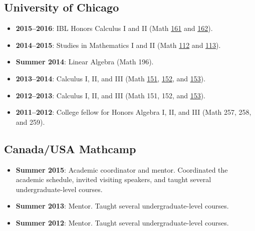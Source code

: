 \documentclass[a4paper]{moderncv}
\begin{document}
\subsection*{University of Chicago}
\label{sec:orgcc51889}
\begin{itemize}
\item \textbf{2015--2016}: IBL Honors Calculus I and II (Math \href{http://www.math.uchicago.edu/\~mcreek/fall\_2015/math\_16100/index.html}{161} and \href{teaching/162win16/}{162}).
\item \textbf{2014--2015}: Studies in Mathematics I and II (Math \href{112aut14/}{112} and \href{113win15/}{113}).
\item \textbf{Summer 2014}: Linear Algebra (Math 196).
\item \textbf{2013--2014}: Calculus I, II, and III (Math \href{}{151}, \href{}{152}, and \href{}{153}).
\item \textbf{2012--2013}: Calculus I, II, and III (Math 151, 152, and \href{}{153}).
\item \textbf{2011--2012}: College fellow for Honors Algebra I, II, and III (Math 257, 258, and 259).
\end{itemize}

\subsection*{Canada/USA Mathcamp}
\label{sec:orgc5e02ec}
\begin{itemize}
\item \textbf{Summer 2015}: Academic coordinator and mentor. Coordinated the academic schedule, invited visiting speakers, and taught several undergraduate-level courses.
\item \textbf{Summer 2013}: Mentor. Taught several undergraduate-level courses.
\item \textbf{Summer 2012}: Mentor. Taught several undergraduate-level courses.
\end{itemize}
\end{document}
